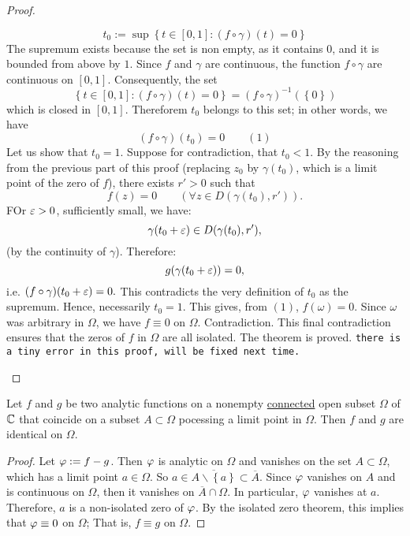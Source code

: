 \begin{proof}
\begin{itemize}
    \[
    t_0 := \sup \left\{ t \in   \left[ 0, 1 \right]: (f \circ  \gamma ) (t) = 0 \right\} 
    \]
    The supremum exists because the set is non empty, as it contains $0$, and it is bounded from above by $1$. Since $f$ 
    and $\gamma $ are continuous, the function $f \circ \gamma $  are continuous on $\left[ 0, 1 \right]$. Consequently, 
    the set 
    \[
      \left\{ t \in  [0, 1]: (f \circ \gamma ) (t) =  0 \right\} = 
      \left( f \circ  \gamma  \right) ^{-1} \left( \left\{ 0 \right\} \right) 
    \]
    which is closed in $[0, 1]$. Thereforem $t_0$ belongs to this set; in other words, we have
    \[
    \left( f \circ \gamma  \right) (t_0) = 0 \quad \quad (1) 
    \]
    Let us show that $t_0  = 1$. Suppose for contradiction, that $t_0 <  1$. By the reasoning from the previous 
    part of this proof (replacing $z_0 $ by $\gamma (t_0)$, which is a limit point of the zero of $f$), 
    there exists $r' > 0$ such that 
    \[
    f(z)  = 0 \quad \quad (\forall  z \in   D(\gamma (t_0), r') ) .
    \]
    FOr $\varepsilon  > 0$, sufficiently small, we have: 
    \[
    \gamma (t_0 + \varepsilon ) \in  D(\gamma (t_0), r'),
    \]
    (by the continuity of $\gamma $). Therefore: 
    \[
    g(\gamma (t_0 + \varepsilon ) ) = 0,
    \]
    i.e. $(f \circ  \gamma ) ( t_0  + \varepsilon )  = 0.$
    This contradicts the very definition of $t_0$ as the supremum. Hence, necessarily $t_0 = 1$. This gives, from 
    $(1) $, $f (\omega) = 0$. Since $\omega$ was arbitrary in $\Omega$, we have $f \equiv  0$ on $\Omega$. Contradiction. This 
    final contradiction ensures that the zeros of $f$ in $\Omega$ are all isolated. The theorem is proved. 
    \texttt{there is a tiny error in this proof, will be fixed next time.}
\end{itemize}
\end{proof}
\begin{corollary}
  Let $f$ and $g$ be two analytic functions on a nonempty \underline{connected} open subset 
  $\Omega$ of $\mathbb{C} $ that coincide on a subset $A \subset \Omega$ pocessing a limit point in $\Omega$. Then 
  $f$ and $g$ are identical on $\Omega$.
\end{corollary}
\begin{proof}
Let $\varphi := f - g$. Then $\varphi$ is analytic on $\Omega$ and vanishes on the set $A \subset \Omega$, which has a limit
point $a \in  \Omega$. So $a \in  \overline{A \backslash  \left\{ a \right\}} \subset \overline{A}$. Since 
$\varphi$ vanishes on $A$ and is continuous on $\Omega$, then it vanishes on $\overline{A} \cap \Omega$. In particular, 
$\varphi$ vanishes at $a.$ Therefore, $a$ is a non-isolated
zero of $\varphi$. By the isolated zero theorem, this implies
that $\varphi \equiv 0$ on $\Omega$; That is, 
$f \equiv g$ on $\Omega$.
\end{proof}
